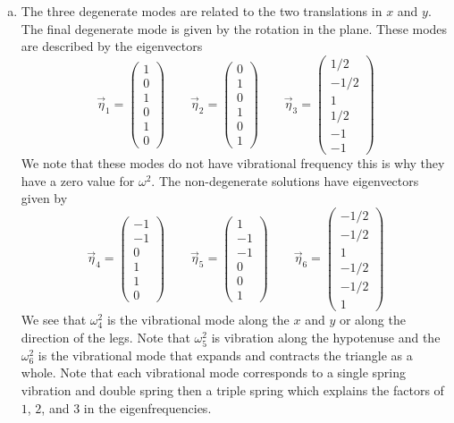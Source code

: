 \documentclass[11pt]{article}
\numberwithin{equation}{section}
\begin{document}
\begin{enumerate}[(a)]
\item The three degenerate modes are related to the two translations in $x$ and $y$. The 
final degenerate mode is given by the rotation in the plane. These modes are described by 
the eigenvectors
$$\vec{\eta}_1 = \left(\begin{array}{c}1\\0\\1\\0\\1\\0\end{array}\right)
\qquad\vec{\eta}_2 = \left(\begin{array}{c}0\\1\\0\\1\\0\\1\end{array}\right)
\qquad\vec{\eta}_3 = \left(\begin{array}{c}1/2\\-1/2\\1\\1/2\\-1\\-1\end{array}\right)$$
We note that these modes do not
have vibrational frequency this is why they have a zero value for $\omega^2$. The 
non-degenerate solutions have eigenvectors given by
$$\vec{\eta}_4 = \left(\begin{array}{c}-1\\-1\\0\\1\\1\\0\end{array}\right)
\qquad\vec{\eta}_5 = \left(\begin{array}{c}1\\-1\\-1\\0\\0\\1\end{array}\right)
\qquad\vec{\eta}_6 = \left(\begin{array}{c}-1/2\\-1/2\\1\\-1/2\\-1/2\\1\end{array}\right)$$
We see that $\omega^2_4$ is the vibrational mode along the $x$ and $y$ or along the 
direction of the legs. Note that $\omega^2_5$ is vibration along the hypotenuse and the 
$\omega^2_6$ is the vibrational mode that expands and contracts the triangle as a whole. Note
that each vibrational mode corresponds to a single spring vibration and double spring then a
triple spring which explains the factors of $1$, $2$, and $3$ in the eigenfrequencies.
\end{enumerate}
\end{document}
